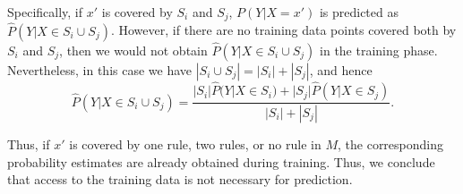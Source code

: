 Specifically, if $x'$ is covered by $S_i$ and $S_j$, $P(Y|X=x')$ is predicted as $\hat{P}(Y|X \in S_i \cup S_j)$. However, if there are no training data points covered both by $S_i$ and $S_j$, then we would not obtain $\hat{P}(Y|X \in S_i \cup S_j)$ in the training phase. Nevertheless, in this case we have  $|S_i \cup S_j| = |S_i| + |S_j|$, and hence
\begin{equation}
    \hat{P}(Y|X \in S_i \cup S_j) = \frac{|S_i| \hat{P}(Y|X\in S_i) + |S_j| \hat{P}(Y|X\in S_j)}{|S_i| + |S_j|}.
\end{equation}

Thus, if $x'$ is covered by one rule, two rules, or no rule in $M$, the corresponding probability estimates are already obtained during training. Thus, we conclude that access to the training data is not necessary for prediction.

%
%


